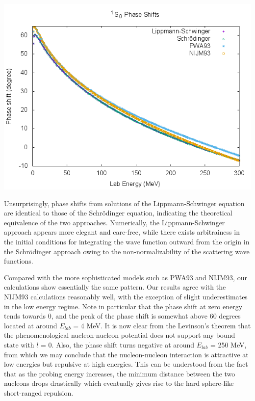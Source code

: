 \documentclass{article}
\newenvironment{Figure}
  {\par\medskip\noindent\minipage{\linewidth}}
  {\endminipage\par\medskip}
\begin{document}
\begin{multicols}{2}
\begin{Figure}
\centering
\includegraphics[width=\textwidth]{res.png}
\label{compare}
\end{Figure}

Unsurprisingly, phase shifts from solutions of the Lippmann-Schwinger equation are identical to those of the Schr\"{o}dinger equation, indicating the theoretical equivalence of the two approaches. Numerically, the Lippmann-Schwinger approach appears more elegant and care-free, while there exists arbitrainess in the initial conditions for integrating the wave function outward from the origin in the Schr\"{o}dinger approach owing to the non-normalizability of the scattering wave functions.

Compared with the more sophisticated models such as PWA93 and NIJM93, our calculations show essentially the same pattern. Our results agree with the NIJM93 calculations reasonably well, with the exception of slight underestimates in the low energy regime. Note in particular that the phase shift at zero energy tends towards 0, and the peak of the phase shift is somewhat above 60 degrees located at around $E_{lab}$ = 4 MeV. It is now clear from the Levinson's theorem that the phenomenological nucleon-nucleon potential does not support any bound state with $l$ = 0. Also, the phase shift turns negative at around $E_{lab}$ = 250 MeV, from which we may conclude that the nucleon-nucleon interaction is attractive at low energies but repulsive at high energies. This can be understood from the fact that as the probing energy increases, the minimum distance between the two nucleons drops drastically which eventually gives rise to the hard sphere-like short-ranged repulsion.


\end{multicols}
\end{document}
